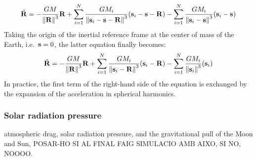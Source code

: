 \documentclass[../main.tex]{subfiles}
\begin{document}
\begin{equation}
  \ddot{\boldsymbol{\mathrm{R}}}=-\frac{GM}{\left\|\boldsymbol{\mathrm{R}}\right\|^3}\boldsymbol{\mathrm{R}}+\sum_{i=1}^N\frac{GM_i}{\left\|\boldsymbol{\mathrm{s}}_i-\boldsymbol{\mathrm{s}}-\boldsymbol{\mathrm{R}}\right\|^3}(\boldsymbol{\mathrm{s}}_i-\boldsymbol{\mathrm{s}}-\boldsymbol{\mathrm{R}})-\sum_{i=1}^N\frac{GM_i}{\left\|\boldsymbol{\mathrm{s}}_i-\boldsymbol{\mathrm{s}}\right\|^3}(\boldsymbol{\mathrm{s}}_i-\boldsymbol{\mathrm{s}})
\end{equation}
Taking the origin of the inertial reference frame at the center of mass of the Earth, i.e.\ $\boldsymbol{\mathrm{s}}=0$, the latter equation finally becomes:
\begin{equation}
  \ddot{\boldsymbol{\mathrm{R}}}=-\frac{GM}{\left\|\boldsymbol{\mathrm{R}}\right\|^3}\boldsymbol{\mathrm{R}}+\sum_{i=1}^N\frac{GM_i}{\left\|\boldsymbol{\mathrm{s}}_i-\boldsymbol{\mathrm{R}}\right\|^3}(\boldsymbol{\mathrm{s}}_i-\boldsymbol{\mathrm{R}})-\sum_{i=1}^N\frac{GM_i}{\left\|\boldsymbol{\mathrm{s}}_i\right\|^3}(\boldsymbol{\mathrm{s}}_i)
\end{equation}
In practice, the first term of the right-hand side of the equation is exchanged by the expansion of the acceleration in spherical harmonics.

\subsubsection{Solar radiation pressure}


atmospheric drag, solar radiation pressure, and the gravitational pull of the Moon and Sun,
POSAR-HO SI AL FINAL FAIG SIMULACIO AMB AIXO, SI NO, NOOOO.

\end{document}
